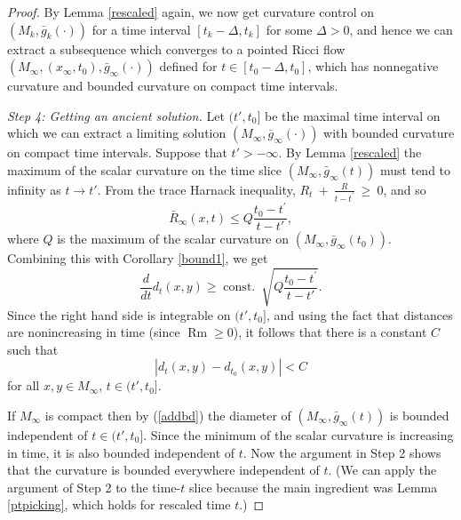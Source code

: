 \documentclass[12pt]{amsart}
\newcommand{\const}{\operatorname{const.}}
\newcommand{\De}{\Delta}
\newcommand{\Rm}{\operatorname{Rm}}
\newcommand{\ra}{\rightarrow}
\numberwithin{equation}{section}
\theoremstyle{plain}
\theoremstyle{definition}
\theoremstyle{remark}
\begin{document}
\begin{proof}
By Lemma \ref{rescaled} again,
we now get curvature control
 on $(M_k,\bar g_k(\cdot))$ for a time
interval $[t_k-\De,t_k]$ for some $\De>0$, and hence
we can extract a  subsequence which converges to a pointed Ricci flow
$(M_\infty,(x_\infty,t_0),\bar g_\infty(\cdot))$ defined
for $t\in[t_0 - \De,t_0]$, which has nonnegative curvature and bounded
curvature on 
compact time intervals.


\bigskip
{\em Step 4: Getting an ancient solution.}
Let $(t',t_0]$ be the maximal time interval on which 
we can extract a limiting solution $(M_\infty,\bar g_\infty(\cdot))$
with bounded curvature on compact time intervals.
Suppose that $t' > -\infty$.
By Lemma \ref{rescaled} the maximum of the scalar curvature
on the time slice $(M_\infty,\bar g_\infty(t))$ must tend
to infinity as $t\ra t'$.  From the trace Harnack inequality,
$R_t \: + \: \frac{R}{t - t^\prime} \: \ge \: 0$, and so
\begin{equation}
\bar R_\infty(x,t)\leq Q \frac{t_0 - t^\prime}{t-t'},
\end{equation}  
where $Q$ is the maximum of the scalar curvature
on $(M_\infty,\bar g_\infty(t_0))$.  Combining this
with Corollary \ref{bound1},
we get 
\begin{equation}
\frac{d}{dt}d_t(x,y)\geq \const \: \sqrt{Q \frac{t_0 - t^\prime}{t-t'}}.
\end{equation}
Since the right hand side is integrable on $(t',t_0]$, and using
the fact that distances are nonincreasing in time (since $\Rm \geq 0$),
it follows that there is a constant $C$ such that
\begin{equation}
\label{addbd}
|d_t(x,y)-d_{t_0}(x,y)|<C
\end{equation}
for all $x,y\in M_\infty$, $t\in(t',t_0]$.

If $M_\infty$ is compact then by (\ref{addbd}) the diameter of
$(M_\infty,\bar g_\infty(t))$ is bounded independent of
$t\in (t',t_0]$.  Since the minimum of the scalar
curvature is increasing in 
time, it is also bounded independent of $t$.  Now the argument
in Step 2 shows that the curvature is bounded everywhere
independent of $t$.  (We can apply the argument of Step 2 to the
time-$t$ slice because the main ingredient was
Lemma \ref{ptpicking}, which holds for rescaled time $t$.)


\end{proof}
\end{document}
